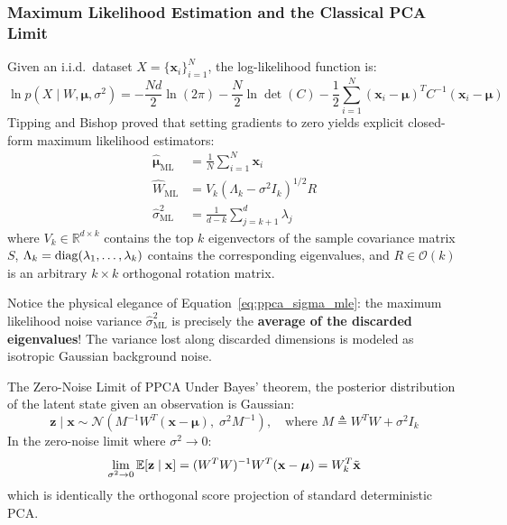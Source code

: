 \subsubsection{Maximum Likelihood Estimation and the Classical PCA Limit}
Given an i.i.d.\ dataset $X = \{\mathbf{x}_i\}_{i=1}^N$, the log-likelihood function is:
\begin{equation}
\ln p(X \mid W, \boldsymbol{\mu}, \sigma^2) = -\frac{N d}{2}\ln(2\pi) - \frac{N}{2}\ln\det(C) - \frac{1}{2}\sum_{i=1}^N (\mathbf{x}_i - \boldsymbol{\mu})^T C^{-1} (\mathbf{x}_i - \boldsymbol{\mu})
\end{equation}
Tipping and Bishop proved that setting gradients to zero yields explicit closed-form maximum likelihood estimators:
\begin{align}
\hat{\boldsymbol{\mu}}_{\text{ML}} &= \frac{1}{N}\sum_{i=1}^N \mathbf{x}_i \\
\hat{W}_{\text{ML}} &= V_k (\Lambda_k - \sigma^2 I_k)^{1/2} R \label{eq:ppca_w_mle} \\
\hat{\sigma}^2_{\text{ML}} &= \frac{1}{d - k}\sum_{j=k+1}^d \lambda_j \label{eq:ppca_sigma_mle}
\end{align}
where $V_k \in \mathbb{R}^{d \times k}$ contains the top $k$ eigenvectors of the sample covariance matrix $S$, $\Lambda_k = \operatorname{diag}(\lambda_1, \dots, \lambda_k)$ contains the corresponding eigenvalues, and $R \in \mathcal{O}(k)$ is an arbitrary $k \times k$ orthogonal rotation matrix. 

Notice the physical elegance of Equation~\eqref{eq:ppca_sigma_mle}: the maximum likelihood noise variance $\hat{\sigma}^2_{\text{ML}}$ is precisely the \textbf{average of the discarded eigenvalues}! The variance lost along discarded dimensions is modeled as isotropic Gaussian background noise.

\begin{theorembox}{The Zero-Noise Limit of PPCA}
Under Bayes' theorem, the posterior distribution of the latent state given an observation is Gaussian:
\begin{equation}
\mathbf{z} \mid \mathbf{x} \sim \mathcal{N}(M^{-1} W^T (\mathbf{x} - \boldsymbol{\mu}), \; \sigma^2 M^{-1}), \quad \text{where } M \triangleq W^T W + \sigma^2 I_k
\label{eq:ppca_posterior}
\end{equation}
In the zero-noise limit where $\sigma^2 \to 0$:
\begin{equation}
\lim_{\sigma^2 \to 0} \operatorname{\mathbb{E}}[\mathbf{z} \mid \mathbf{x}] = (W^T W)^{-1} W^T (\mathbf{x} - \boldsymbol{\mu}) = W_k^T \tilde{\mathbf{x}}
\label{eq:ppca_limit}
\end{equation}
which is identically the orthogonal score projection of standard deterministic PCA.
\end{theorembox}

